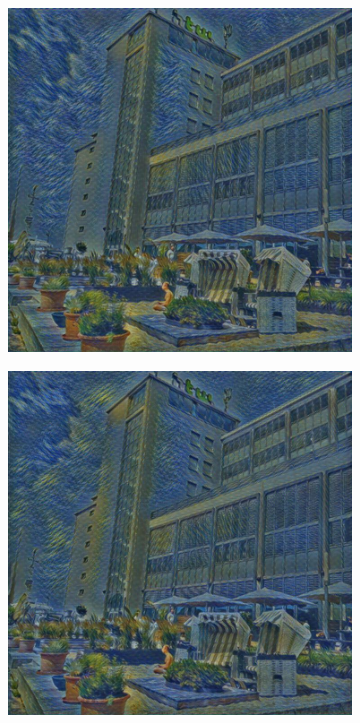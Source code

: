 \begin{figure}[H]
    \begin{subfigure}[h]{0.15\textwidth}
        \centering
        \includegraphics[width=\textwidth]{resources/content/experiments/net4.jpg}
    \end{subfigure}
    \begin{subfigure}[h]{0.15\textwidth}
        \centering
        \includegraphics[width=\textwidth]{resources/content/experiments/net5.jpg}

\end{subfigure}
\end{figure}
